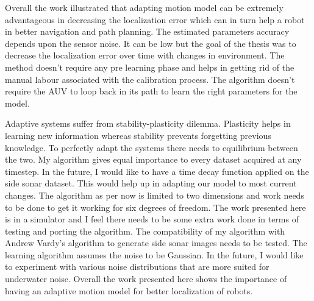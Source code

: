 \documentclass[12pt]{dalcsthesis}
\begin{document}
Overall the work illustrated that adapting motion model can be extremely advantageous in decreasing the localization error which can in turn help a robot in better navigation and path planning. The estimated parameters accuracy depends upon the sensor noise. It can be low but the goal of the thesis was to decrease the localization error over time with changes in environment. The method doesn't require any pre learning phase and helps in getting rid of the manual labour associated with the calibration process. The algorithm doesn't require the AUV to loop back in its path to learn the right parameters for the model.

Adaptive systems suffer from stability-plasticity dilemma. Plasticity helps in learning new information whereas stability prevents forgetting previous knowledge. To perfectly adapt the systems there needs to equilibrium between the two. My algorithm gives equal importance to every dataset acquired at any timestep. In the future, I would like to have a time decay function applied on the side sonar dataset. This would help up in adapting our model to most current changes. The algorithm as per now is limited to two dimensions and work needs to be done to get it working for six degrees of freedom. The work presented here is in a simulator and I feel there needs to be some extra work done in terms of testing and porting the algorithm. The compatibility of my algorithm with Andrew Vardy's \cite{vandrish2011side} algorithm to generate side sonar images needs to be tested. The learning algorithm assumes the noise to be Gaussian. In the future, I would like to experiment with various noise distributions that are more suited for underwater noise. Overall the work presented here shows the importance of having an adaptive motion model for better localization of robots.   




\end{document}
